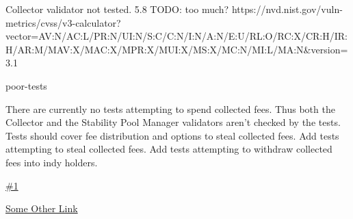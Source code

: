 \vuln
    { %
      Collector validator not tested.
    }
    { %
      5.8 TODO: too much?
    }
    { %
    https://nvd.nist.gov/vuln-metrics/cvss/v3-calculator?vector=AV:N/AC:L/PR:N/UI:N/S:C/C:N/I:N/A:N/E:U/RL:O/RC:X/CR:H/IR:H/AR:M/MAV:X/MAC:X/MPR:X/MUI:X/MS:X/MC:N/MI:L/MA:N&version=3.1
    }
    { %
    \item poor-tests
    }
    { %
    There are currently no tests attempting to spend collected fees. Thus both the Collector and the Stability Pool Manager validators aren't checked by the tests.
    Tests should cover fee distribution and options to steal collected fees.
    }
    { %
      Add tests attempting to steal collected fees. Add tests attempting to withdraw collected fees into indy holders.
    }
    { %
    \item\href{github.com}{\#1}
    \item\href{github.com}{Some Other Link}
    }
